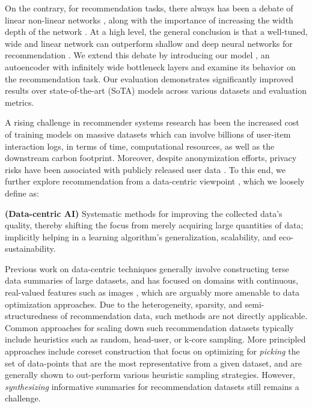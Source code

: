 \documentclass{article}
\begin{document}
On the contrary, for recommendation tasks, there always has been a debate of linear \vs non-linear networks \cite{linear_or_non_linear, rethinking_ntk}, along with the importance of increasing the width \vs depth of the network \cite{wide_and_deep,naumov:dlrm}. At a high level, the general conclusion is that a well-tuned, wide and linear network can outperform shallow and deep neural networks for recommendation \cite{mf_vs_ncf}. We extend this debate by introducing our model \model, an autoencoder with infinitely wide bottleneck layers and examine its behavior on the recommendation task. Our evaluation demonstrates significantly improved results over state-of-the-art (SoTA) models across various datasets and evaluation metrics. 



A rising challenge in recommender systems research has been the increased cost of training models on massive datasets which can involve billions of user-item interaction logs, in terms of time, computational resources, as well as the downstream carbon footprint. Moreover, despite anonymization efforts, privacy risks have been associated with publicly released user data \cite{netflix_deanon}.
To this end, we further explore recommendation from a data-centric viewpoint \cite{ng_data_centric}, which we loosely define as: 

\begin{definition} \label{def:data_centric}
    {\normalfont \textbf{(Data-centric AI)}} Systematic methods for improving the collected data's quality, thereby shifting the focus from merely acquiring large quantities of data; implicitly helping in a learning algorithm's generalization, scalability, and eco-sustainability.
\end{definition}

Previous work on data-centric techniques generally involve constructing terse data summaries of large datasets, and has focused on domains with continuous, real-valued features such as images \cite{zhao_dsa, kip_conv}, which are arguably more amenable to data optimization approaches. Due to the heterogeneity, sparsity, and semi-structuredness of recommendation data, such methods are not directly applicable. Common approaches for scaling down such recommendation datasets typically include heuristics such as random, head-user, or k-core sampling. More principled approaches include coreset construction \cite{wsdm22} that focus on optimizing for \emph{picking} the set of data-points that are the most representative from a given dataset, and are generally shown to out-perform various heuristic sampling strategies. However, \emph{synthesizing} informative summaries for recommendation datasets still remains a challenge.
\end{document}
